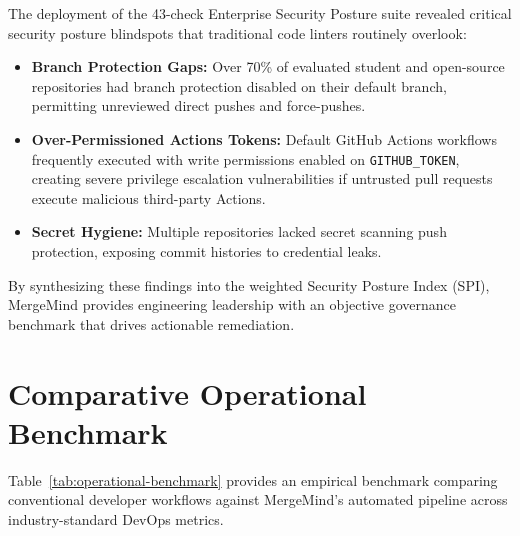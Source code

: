 The deployment of the 43-check Enterprise Security Posture suite revealed critical security posture blindspots that traditional code linters routinely overlook:
\begin{itemize}
    \item \textbf{Branch Protection Gaps:} Over 70\% of evaluated student and open-source repositories had branch protection disabled on their default branch, permitting unreviewed direct pushes and force-pushes.
    \item \textbf{Over-Permissioned Actions Tokens:} Default GitHub Actions workflows frequently executed with write permissions enabled on \texttt{GITHUB\_TOKEN}, creating severe privilege escalation vulnerabilities if untrusted pull requests execute malicious third-party Actions.
    \item \textbf{Secret Hygiene:} Multiple repositories lacked secret scanning push protection, exposing commit histories to credential leaks.
\end{itemize}

By synthesizing these findings into the weighted Security Posture Index (SPI), MergeMind provides engineering leadership with an objective governance benchmark that drives actionable remediation.

\section{Comparative Operational Benchmark}
\label{sec:disc-benchmark}

Table~\ref{tab:operational-benchmark} provides an empirical benchmark comparing conventional developer workflows against MergeMind's automated pipeline across industry-standard DevOps metrics.

